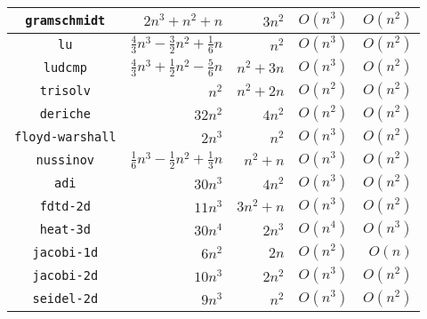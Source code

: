 \documentclass{article}
\begin{document}
\begin{table}
\begin{tabu}{|c|r|r|r|r|}
\hline
{\tt gramschmidt} & $2n^3+n^2+n$ & $3n^2$ & $O(n^3)$ & $O(n^2)$\\
\hline
{\tt lu} & $\frac{4}{3}n^3 - \frac{3}{2}n^2 +\frac{1}{6}n$ & $n^2$ & $O(n^3)$ & $O(n^2)$\\
\hline
{\tt ludcmp} & $\frac{4}{3}n^3+\frac{1}{2}n^2 -\frac{5}{6}n$ & $n^2+3n$ & $O(n^3)$ & $O(n^2)$\\
\hline
{\tt trisolv} & $n^2$ & $n^2+2n$ & $O(n^2)$ & $O(n^2)$\\
\hline
{\tt deriche} & $32n^2$ & $4n^2$ & $O(n^2)$ & $O(n^2)$\\
\hline
{\tt floyd-warshall} & $2n^3$ & $n^2$ & $O(n^3)$ & $O(n^2)$\\
\hline
{\tt nussinov} & $\frac{1}{6}n^3 - \frac{1}{2}n^2 + \frac{1}{3}n$ & $n^2+n$ & $O(n^3)$ & $O(n^2)$\\
\hline
{\tt adi} & $30n^3$ & $4n^2$ & $O(n^3)$ & $O(n^2)$\\
\hline
{\tt fdtd-2d} & $11n^3$ & $3n^2+n$ & $O(n^3)$ & $O(n^2)$\\
\hline
{\tt heat-3d} & $30n^4$ & $2n^3$ & $O(n^4)$ & $O(n^3)$\\
\hline
{\tt jacobi-1d} & $6n^2$ & $2n$ & $O(n^2)$ & $O(n)$\\
\hline
{\tt jacobi-2d} & $10n^3$ & $2n^2$ & $O(n^3)$ & $O(n^2)$\\
\hline
{\tt seidel-2d} & $9n^3$ & $n^2$ & $O(n^3)$ & $O(n^2)$\\
\hline
\end{tabu}
\end{table}



\end{document}
